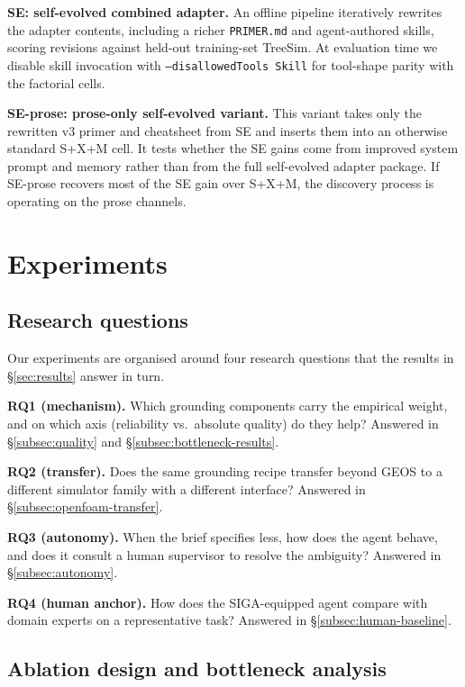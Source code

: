 \documentclass{article}
\begin{document}
\textbf{SE: self-evolved combined adapter.} An offline pipeline iteratively rewrites the adapter contents, including a richer \texttt{PRIMER.md} and agent-authored skills, scoring revisions against held-out training-set TreeSim. At evaluation time we disable skill invocation with \texttt{--disallowedTools Skill} for tool-shape parity with the factorial cells.

\textbf{SE-prose: prose-only self-evolved variant.} This variant takes only the rewritten v3 primer and cheatsheet from SE and inserts them into an otherwise standard S+X+M cell. It tests whether the SE gains come from improved system prompt and memory rather than from the full self-evolved adapter package. If SE-prose recovers most of the SE gain over S+X+M, the discovery process is operating on the prose channels.

\section{Experiments}
\label{sec:eval}

\subsection{Research questions}
\label{subsec:rqs}

Our experiments are organised around four research questions that the results in \S\ref{sec:results} answer in turn.

\textbf{RQ1 (mechanism).} Which grounding components carry the empirical weight, and on which axis (reliability vs.\ absolute quality) do they help? Answered in \S\ref{subsec:quality} and \S\ref{subsec:bottleneck-results}.

\textbf{RQ2 (transfer).} Does the same grounding recipe transfer beyond GEOS to a different simulator family with a different interface? Answered in \S\ref{subsec:openfoam-transfer}.

\textbf{RQ3 (autonomy).} When the brief specifies less, how does the agent behave, and does it consult a human supervisor to resolve the ambiguity? Answered in \S\ref{subsec:autonomy}.

\textbf{RQ4 (human anchor).} How does the SIGA-equipped agent compare with domain experts on a representative task? Answered in \S\ref{subsec:human-baseline}.

\subsection{Ablation design and bottleneck analysis}
\label{subsec:cells}
\end{document}
